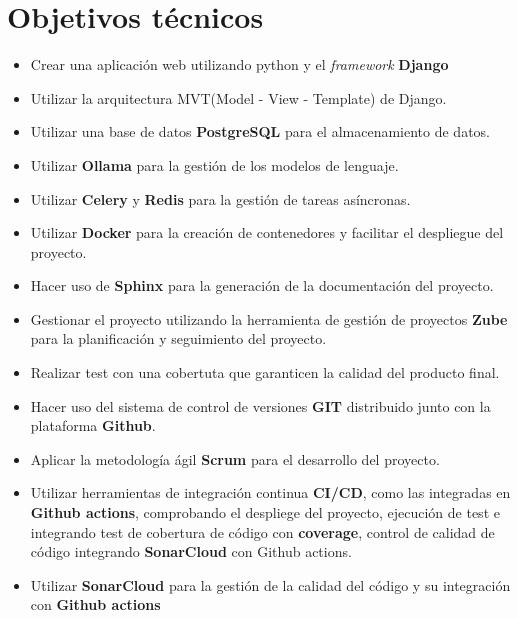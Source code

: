 \section{Objetivos técnicos}\label{objetivos_tecnicos}
\begin{itemize}
    \item Crear una aplicación web utilizando python y el \textit{framework} \textbf{Django}
    \item Utilizar la arquitectura MVT(Model - View - Template) de Django.
    \item Utilizar una base de datos \textbf{PostgreSQL} para el almacenamiento de datos.
    \item Utilizar \textbf{Ollama} para la gestión de los modelos de lenguaje.
    \item Utilizar \textbf{Celery} y \textbf{Redis} para la gestión de tareas asíncronas.
    \item Utilizar \textbf{Docker} para la creación de contenedores y facilitar el despliegue del proyecto.
    \item Hacer uso de \textbf{Sphinx} para la generación de la documentación del proyecto.
    \item Gestionar el proyecto utilizando la herramienta de gestión de proyectos \textbf{Zube} para la planificación y seguimiento del proyecto.
    \item Realizar test con una cobertuta que garanticen la calidad del producto final.
    \item Hacer uso del sistema de control de versiones \textbf{GIT} distribuido junto con la plataforma \textbf{Github}.
    \item Aplicar la metodología ágil \textbf{Scrum} para el desarrollo del proyecto.
    \item Utilizar herramientas de integración continua \textbf{CI/CD}, como las integradas en \textbf{Github actions}, comprobando el despliege del proyecto, ejecución de test e integrando test de cobertura de código con \textbf{coverage}, control de calidad de código integrando \textbf{SonarCloud} con Github actions.
    \item Utilizar \textbf{SonarCloud} para la gestión de la calidad del código y su integración con \textbf{Github actions}
\end{itemize}

